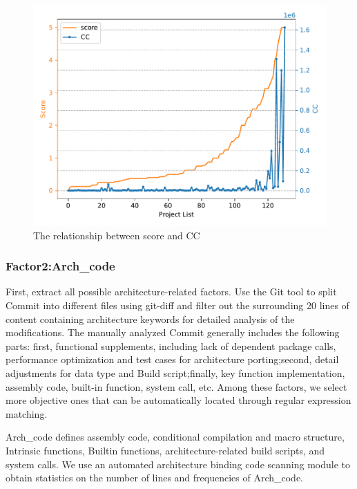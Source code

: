 \documentclass[sigconf,screen,review,anonymous]{acmart}
\begin{document}
\begin{figure}
  \centering
  \includegraphics[width=\linewidth]{relationship.pdf}
  \caption{The relationship between score and CC}
  \label{fig:relationship}
\end{figure}

\subsubsection{Factor2:Arch\_code}

First, extract all possible architecture-related factors.
Use the Git tool to split Commit into different files using git-diff and filter out the surrounding 20 lines of content containing architecture keywords for detailed analysis of the modifications.
The manually analyzed Commit generally includes the following parts: first, functional supplements, including lack of dependent package calls, performance optimization and test cases for architecture porting;second, detail adjustments for data type and Build script;finally, key function implementation, assembly code, built-in function, system call, etc.
Among these factors, we select more objective ones that can be automatically located through regular expression matching.

Arch\_code defines assembly code, conditional compilation and macro structure, Intrinsic functions, Builtin functions, architecture-related build scripts, and system calls.
We use an automated architecture binding code scanning module to obtain statistics on the number of lines and frequencies of Arch\_code.
\end{document}
